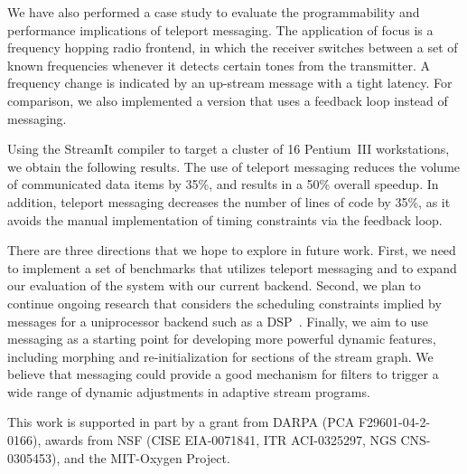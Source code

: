 \documentclass{csailabstractbook}
\begin{document}
We have also performed a case study to evaluate the programmability
and performance implications of teleport messaging.  The application
of focus is a frequency hopping radio frontend, in which the receiver
switches between a set of known frequencies whenever it detects
certain tones from the transmitter.  A frequency change is indicated
by an up-stream message with a tight latency.  For comparison, we also
implemented a version that uses a feedback loop instead of messaging.

Using the StreamIt compiler to target a cluster of 16 Pentium~III
workstations, we obtain the following results.  The use of teleport
messaging reduces the volume of communicated data items by 35\%, and
results in a 50\% overall speedup.  In addition, teleport messaging
decreases the number of lines of code by 35\%, as it avoids the manual
implementation of timing constraints via the feedback loop.


There are three directions that we hope to explore in future work.
First, we need to implement a set of benchmarks that utilizes teleport
messaging and to expand our evaluation of the system with our current
backend.  Second, we plan to continue ongoing research that considers
the scheduling constraints implied by messages for a uniprocessor
backend such as a DSP~\cite{karczma-thesis}.  Finally, we aim to use
messaging as a starting point for developing more powerful dynamic
features, including morphing and re-initialization for sections of the
stream graph.  We believe that messaging could provide a good
mechanism for filters to trigger a wide range of dynamic adjustments
in adaptive stream programs.


This work is supported in part by a grant from DARPA (PCA
F29601-04-2-0166), awards from NSF (CISE EIA-0071841, ITR ACI-0325297,
NGS CNS-0305453), and the MIT-Oxygen Project.


\end{document}
